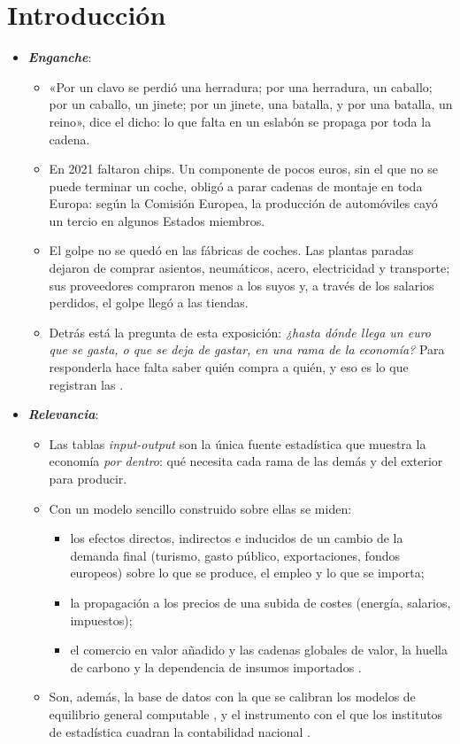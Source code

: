 \documentclass[11pt]{article}
\begin{document}
\tceetitulo

\section*{Introducción}

\begin{itemize}
\item \textbf{\emph{Enganche}}:
  \begin{itemize}
  \item «Por un clavo se perdió una herradura; por una herradura, un caballo; por un caballo, un jinete; por un jinete, una batalla, y por una batalla, un reino», dice el dicho: lo que falta en un eslabón se propaga por toda la cadena.
  \item En 2021 faltaron chips. Un componente de pocos euros, sin el que no se puede terminar un coche, obligó a parar cadenas de montaje en toda Europa: según la Comisión Europea, la producción de automóviles cayó un tercio en algunos Estados miembros\nocite{CE2022ChipsAct}.
  \item El golpe no se quedó en las fábricas de coches. Las plantas paradas dejaron de comprar asientos, neumáticos, acero, electricidad y transporte; sus proveedores compraron menos a los suyos y, a través de los salarios perdidos, el golpe llegó a las tiendas.
  \item Detrás está la pregunta de esta exposición: \emph{¿hasta dónde llega un euro que se gasta, o que se deja de gastar, en una rama de la economía?} Para responderla hace falta saber quién compra a quién, y eso es lo que registran las .
  \end{itemize}

\item \textbf{\emph{Relevancia}}:
  \begin{itemize}
  \item Las tablas \emph{input-output} son la única fuente estadística que muestra la economía \emph{por dentro}: qué necesita cada rama de las demás y del exterior para producir.
  \item Con un modelo sencillo construido sobre ellas se miden:
    \begin{itemize}
    \item los efectos directos, indirectos e inducidos de un cambio de la demanda final (turismo, gasto público, exportaciones, fondos europeos) sobre lo que se produce, el empleo y lo que se importa;
    \item la propagación a los precios de una subida de costes (energía, salarios, impuestos);
    \item el comercio en valor añadido y las cadenas globales de valor, la huella de carbono y la dependencia de insumos importados .
    \end{itemize}
  \item Son, además, la base de datos con la que se calibran los modelos de equilibrio general computable , y el instrumento con el que los institutos de estadística cuadran la contabilidad nacional .
  \end{itemize}


\end{itemize}
\end{document}
